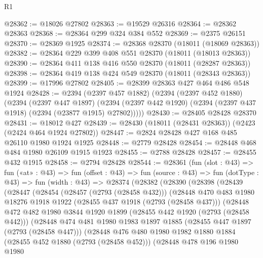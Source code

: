 \begin{lexlean}{R1}
\begin{coremodule}
@28362 := @18026 @27802
@28363 := @19529 @26316
@28364 := @28362 @28363
@28368 := @28364 @299 @324 @384 @552
@28369 := @2375 @26151
@28370 := @28369 @1925
@28374 := @28368 @28370 (@18011 (@18069 @28363))
@28382 := @28364 @229 @399 @408 @551 @28370 (@18011 (@18013 @28363))
@28390 := @28364 @411 @138 @416 @550 @28370 (@18011 (@28287 @28363))
@28398 := @28364 @419 @138 @424 @549 @28370 (@18011 (@28343 @28363))
@28399 := @17996 @27802
@28405 := @28399 @28363 @427 @464 @486 @548 @1924
@28428 := @2394
    (@2397 @457 @1882)
    (@2394
      (@2397 @452 @1880)
      (@2394
        (@2397 @447 @1897)
        (@2394 (@2397 @442 @1920) (@2394 (@2397 @437 @1918) (@2394 (@23877 @1915) @27802)))))
@28430 := @28405 @28428 @28370
@28431 := @18012 @427
@28439 := @28430 (@18011 (@28431 @28363)) (@2423 (@2424 @464 @1924 @27802))
@28447 := @2824 @28428 @427 @168 @485 @26110 @1980 @1924 @1925
@28448 := @2779 @28428
@28454 := @28448 @468 @484 @1980 @26109 @1915 @1923
@28455 := @2788 @28428
@28457 := @28455 @432 @1915
@28458 := @2794 @28428
@28544 := @28361
    (fun (slot : @43) =>
    fun («at» : @43) =>
    fun (offset : @43) =>
    fun (source : @43) =>
    fun (dotType : @43) =>
    fun (width : @43) =>
    @28374
      (@28382
        (@28390
          (@28398
            (@28439
              (@28447
                (@28454
                  (@28457 (@2793 (@28458 @432)))
                  (@28448
                    @470
                    @483
                    @1980
                    @18276
                    @1918
                    @1922
                    (@28455 @437 @1918 (@2793 (@28458 @437)))
                    (@28448
                      @472
                      @482
                      @1980
                      @3844
                      @1920
                      @1899
                      (@28455 @442 @1920 (@2793 (@28458 @442)))
                      (@28448
                        @474
                        @481
                        @1980
                        @1983
                        @1897
                        @1885
                        (@28455 @447 @1897 (@2793 (@28458 @447)))
                        (@28448
                          @476
                          @480
                          @1980
                          @1982
                          @1880
                          @1884
                          (@28455 @452 @1880 (@2793 (@28458 @452)))
                          (@28448
                            @478
                            @196
                            @1980
                            @1980

\end{coremodule}
\end{lexlean}
